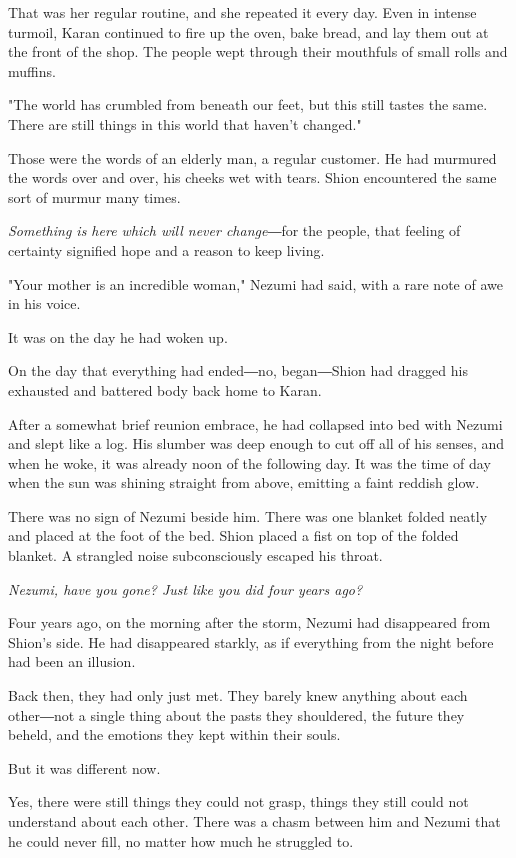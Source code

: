 That was her regular routine, and she repeated it every day. Even in
intense turmoil, Karan continued to fire up the oven, bake bread, and
lay them out at the front of the shop. The people wept through their
mouthfuls of small rolls and muffins.

"The world has crumbled from beneath our feet, but this still tastes the
same. There are still things in this world that haven't changed."

Those were the words of an elderly man, a regular customer. He had
murmured the words over and over, his cheeks wet with tears. Shion
encountered the same sort of murmur many times.

\emph{Something is here which will never change}―for the people, that feeling
of certainty signified hope and a reason to keep living.

"Your mother is an incredible woman," Nezumi had said, with a rare note
of awe in his voice.

It was on the day he had woken up.

On the day that everything had ended―no, began―Shion had dragged his
exhausted and battered body back home to Karan.

After a somewhat brief reunion embrace, he had collapsed into bed with
Nezumi and slept like a log. His slumber was deep enough to cut off all
of his senses, and when he woke, it was already noon of the following
day. It was the time of day when the sun was shining straight from
above, emitting a faint reddish glow.

There was no sign of Nezumi beside him. There was one blanket folded
neatly and placed at the foot of the bed. Shion placed a fist on top of
the folded blanket. A strangled noise subconsciously escaped his throat.

\emph{Nezumi, have you gone? Just like you did four years ago?}

Four years ago, on the morning after the storm, Nezumi had disappeared
from Shion's side. He had disappeared starkly, as if everything from the
night before had been an illusion.

Back then, they had only just met. They barely knew anything about each
other―not a single thing about the pasts they shouldered, the future
they beheld, and the emotions they kept within their souls.

But it was different now.

Yes, there were still things they could not grasp, things they still
could not understand about each other. There was a chasm between him and
Nezumi that he could never fill, no matter how much he struggled to.

